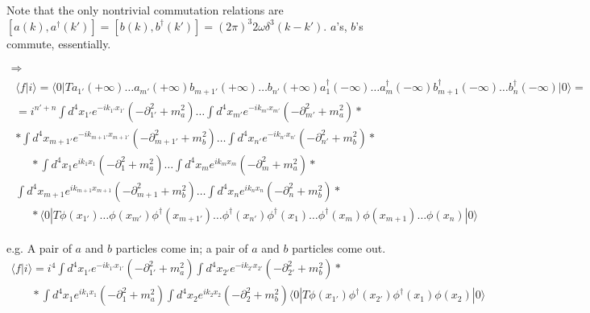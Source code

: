 \documentclass[twoside]{amsart}
\begin{document}
Note that the only nontrivial commutation relations are $[ a(k), a^{\dag}(k') ] = [b(k),b^{\dag}(k')] = (2\pi)^3 2\omega \delta^3(k-k')$.  $a$'s, $b$'s commute, essentially.  

\[
\begin{gathered}
\Longrightarrow  \\ 
\begin{gathered}
  \langle f| i \rangle  = \langle 0 | T a_{1'}(+ \infty) \dots a_{m'}(+\infty) b_{m+1'}(+\infty) \dots b_{n'}(+\infty) a_1^{\dag}(-\infty)\dots a_m^{\dag}(-\infty) b_{m+1}^{\dag}(-\infty)\dots b_n^{\dag}(-\infty)| 0 \rangle = \label{Eq:5-1_LSZ_complex_ab} \\ 
   = i^{n'+n} \int d^4x_{1'} e^{-ik_{1'} x_{1'}} (-\partial_{1'}^2 + m_a^2) \dots \int d^4 x_{m'} e^{-ik_{m'} x_{m'} }( - \partial_{m'}^2 + m_a^2) * \\
* \int d^4 x_{m+1'} e^{-ik_{m+1'} x_{m+1'} } (-\partial_{m+1'}^2 + m_b^2) \dots \int d^4 x_{n'} e^{-ik_{n'} x_{n'}} (-\partial_{n'}^2 + m_b^2) * \\ 
     \phantom{=} *\int d^4x_1 e^{ik_1 x_1} (-\partial_1^2 + m_a^2) \dots \int d^4x_m e^{ik_m x_m} (-\partial_m^2 + m_a^2) * \\
\int d^4 x_{m+1} e^{ik_{m+1} x_{m+1} } (-\partial_{m+1}^2 + m_b^2) \dots \int d^4x_n e^{ik_n x_n} (-\partial_n^2 + m_b^2) * \\ 
     \phantom{=} * \langle 0 | T \phi(x_{1'})\dots \phi(x_{m'}) \phi^{\dag}(x_{m+1'}) \dots \phi^{\dag}(x_{n'}) \phi^{\dag}(x_1) \dots \phi^{\dag}(x_m) \phi(x_{m+1}) \dots \phi(x_n) | 0  \rangle
\end{gathered}
\end{gathered}
\]

e.g. A pair of  $a$ and $b$ particles come in; a pair of $a$ and $b$ particles come out.
\[
\begin{gathered}
  \langle f | i \rangle  = i^4 \int d^4 x_{1'} e^{-ik_{1'} x_{1'} } (-\partial_{1'}^2 + m_a^2) \int d^4x_{2'} e^{-ik_{2'} x_{2'} }(-\partial_{2'}^2 + m_b^2) * \\ 
   \phantom{ = * } * \int d^4x_1 e^{ik_1 x_1} (- \partial_1^2 + m_a^2) \int d^4 x_2 e^{ik_2 x_2} (-\partial_2^2 + m_b^2)  \langle 0 | T\phi(x_{1'}) \phi^{\dag}(x_{2'}) \phi^{\dag}(x_1) \phi(x_2)|0\rangle
\end{gathered}
\]


\end{document}
